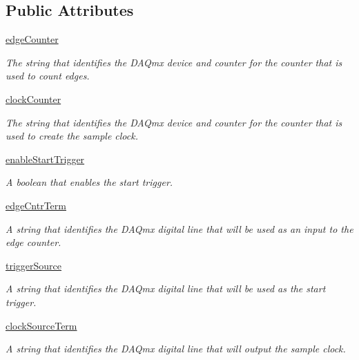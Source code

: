 \subsection*{Public Attributes}
\begin{DoxyCompactItemize}
\item 
\hyperlink{class_chassis_8git_1_1p_counter_1_1p_counter_a6a6ad59340a0bdbce0e21115116cd10c}{edge\-Counter}
\begin{DoxyCompactList}\small\item\em The string that identifies the D\-A\-Qmx device and counter for the counter that is used to count edges. \end{DoxyCompactList}\item 
\hyperlink{class_chassis_8git_1_1p_counter_1_1p_counter_a786395b8325d54efca86113bb85f0a11}{clock\-Counter}
\begin{DoxyCompactList}\small\item\em The string that identifies the D\-A\-Qmx device and counter for the counter that is used to create the sample clock. \end{DoxyCompactList}\item 
\hyperlink{class_chassis_8git_1_1p_counter_1_1p_counter_ac4e636f13e97b17017621f43e4d65c95}{enable\-Start\-Trigger}
\begin{DoxyCompactList}\small\item\em A boolean that enables the start trigger. \end{DoxyCompactList}\item 
\hyperlink{class_chassis_8git_1_1p_counter_1_1p_counter_abcaca1083cd7a8476fb6ecb127761640}{edge\-Cntr\-Term}
\begin{DoxyCompactList}\small\item\em A string that identifies the D\-A\-Qmx digital line that will be used as an input to the edge counter. \end{DoxyCompactList}\item 
\hyperlink{class_chassis_8git_1_1p_counter_1_1p_counter_a2308c1aa3a3c94cea864af076275b37a}{trigger\-Source}
\begin{DoxyCompactList}\small\item\em A string that identifies the D\-A\-Qmx digital line that will be used as the start trigger. \end{DoxyCompactList}\item 
\hyperlink{class_chassis_8git_1_1p_counter_1_1p_counter_a2fb27f44005a6ee09baa193c2e1fcd5b}{clock\-Source\-Term}
\begin{DoxyCompactList}\small\item\em A string that identifies the D\-A\-Qmx digital line that will output the sample clock. \end{DoxyCompactList}\item 

\end{DoxyCompactItemize}
